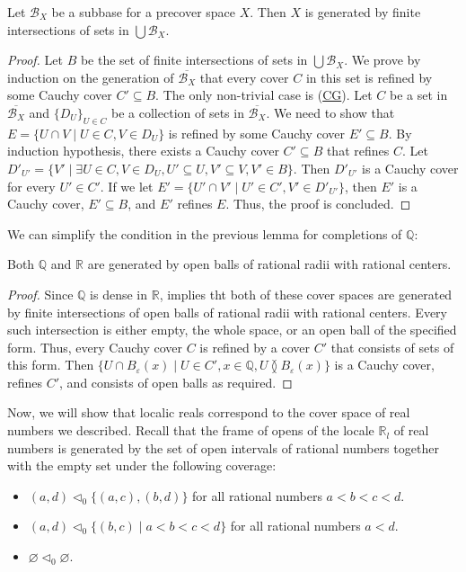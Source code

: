 \documentclass[reqno]{amsart}
\newcommand{\axref}[1]{(\hyperref[ax:#1]{#1})}
\theoremstyle{definition}
\theoremstyle{remark}
\numberwithin{figure}{section}
\newcommand{\overlap}[2]{#1 \between #2}
\begin{document}
\begin{lem}
Let $\mathcal{B}_X$ be a subbase for a precover space $X$.
Then $X$ is generated by finite intersections of sets in $\bigcup \mathcal{B}_X$.
\end{lem}
\begin{proof}
Let $B$ be the set of finite intersections of sets in $\bigcup \mathcal{B}_X$.
We prove by induction on the generation of $\overline{\mathcal{B}_X}$ that every cover $C$ in this set is refined by some Cauchy cover $C' \subseteq B$.
The only non-trivial case is \axref{CG}.
Let $C$ be a set in $\overline{\mathcal{B}_X}$ and $\{ D_U \}_{U \in C}$ be a collection of sets in $\overline{\mathcal{B}_X}$.
We need to show that $E = \{ U \cap V \mid U \in C, V \in D_U \}$ is refined by some Cauchy cover $E' \subseteq B$.
By induction hypothesis, there exists a Cauchy cover $C' \subseteq B$ that refines $C$.
Let $D'_{U'} = \{ V' \mid \exists U \in C, V \in D_U, U' \subseteq U, V' \subseteq V, V' \in B \}$.
Then $D'_{U'}$ is a Cauchy cover for every $U' \in C'$.
If we let $E' = \{ U' \cap V' \mid U' \in C', V' \in D'_{U'} \}$, then $E'$ is a Cauchy cover, $E' \subseteq B$, and $E'$ refines $E$.
Thus, the proof is concluded.
\end{proof}

We can simplify the condition in the previous lemma for completions of $\mathbb{Q}$:

\begin{lem}
Both $\mathbb{Q}$ and $\mathbb{R}$ are generated by open balls of rational radii with rational centers.
\end{lem}
\begin{proof}
Since $\mathbb{Q}$ is dense in $\mathbb{R}$,  implies tht both of these cover spaces are generated by finite intersections of open balls of rational radii with rational centers.
Every such intersection is either empty, the whole space, or an open ball of the specified form.
Thus, every Cauchy cover $C$ is refined by a cover $C'$ that consists of sets of this form.
Then $\{ U \cap B_\varepsilon(x) \mid U \in C', x \in \mathbb{Q}, \overlap{U}{B_\varepsilon(x)} \}$ is a Cauchy cover, refines $C'$, and consists of open balls as required.
\end{proof}

Now, we will show that localic reals correspond to the cover space of real numbers we described.
Recall that the frame of opens of the locale $\mathbb{R}_l$ of real numbers is generated by the set of open intervals of rational numbers together with the empty set under the following coverage:
\begin{itemize}
\item $(a,d) \triangleleft_0 \{ (a,c), (b,d) \}$ for all rational numbers $a < b < c < d$.
\item $(a,d) \triangleleft_0 \{ (b,c) \mid a < b < c < d \}$ for all rational numbers $a < d$.
\item $\varnothing \triangleleft_0 \varnothing$.
\end{itemize}
\end{document}
